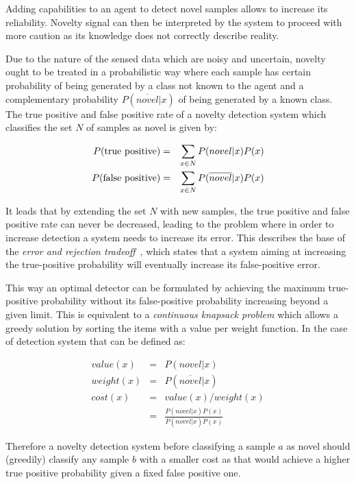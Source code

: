 \documentclass[runningheads,a4paper]{llncs}
\begin{document}
Adding capabilities to an agent to detect novel samples allows to increase its
reliability. Novelty signal can then be interpreted by the system to proceed
with more caution as its knowledge does not correctly describe reality.

Due to the nature of the sensed data which are noisy and uncertain, novelty ought to be
treated in a probabilistic way where each sample has certain probability
of being generated by a class not known to the agent and a complementary probability $P(\overline{novel}|x)$
of being generated by a known class.
The true positive and false positive rate of a novelty detection system which classifies
the set $N$ of samples as novel is given by:

\begin{eqnarray}
P(\textnormal{true positive})  &=& \sum_{x \in N}{P(novel|x)P(x)} \\
P(\textnormal{false positive}) &=& \sum_{x \in N}{P(\overline{novel}|x)P(x})
\end{eqnarray}

It leads that by extending the set $N$ with new samples, the true positive and
false positive rate can never be decreased, leading to the problem where in order
to increase detection a system needs to increase its error. This describes the
base of the \emph{error and rejection tradeoff}~\cite{chow1970optimum}, which
states that a system aiming at increasing the true-positive probability will eventually increase its
false-positive error.

This way an optimal detector can be formulated by achieving the maximum true-positive
probability without its false-positive probability increasing beyond a given limit.
This is equivalent to a \emph{continuous knapsack problem} which allows a greedy
solution by sorting the items with a value per weight function. In the case of 
detection system that can be defined as:

\begin{eqnarray}
value(x)  &=& P(novel|x) \\
weight(x) &=& P(\overline{novel}|x) \\
cost(x)   &=& value(x)/weight(x) \\
          &=& \frac{P(novel|x)P(x)}{P(\overline{novel}|x)P(x)}
\end{eqnarray}

Therefore a novelty detection system before classifying a sample $a$ as novel should (greedily)
classify any sample $b$ with a smaller cost as that would achieve a higher true positive probability 
given a fixed false positive one.
\end{document}
